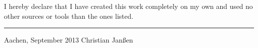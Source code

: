 \documentclass[final,twoside,11pt,titlepage,a4paper,english,bibliography=totocnumbered,listof=numbered]{scrbook}
\newcommand{\auth}{Christian Jan\ss en}
\begin{document}
I hereby declare that I have created this work completely on my own and used no other sources or tools than the ones listed.

\vspace{30 mm}

\begin{flushright}
	\rule{90mm}{1pt}

	Aachen, September 2013 \hspace{24 mm} \auth
\end{flushright}

%

%

\tableofcontents{}

\mainmatter

\part{}



\part{}


\part{}


\end{document}
